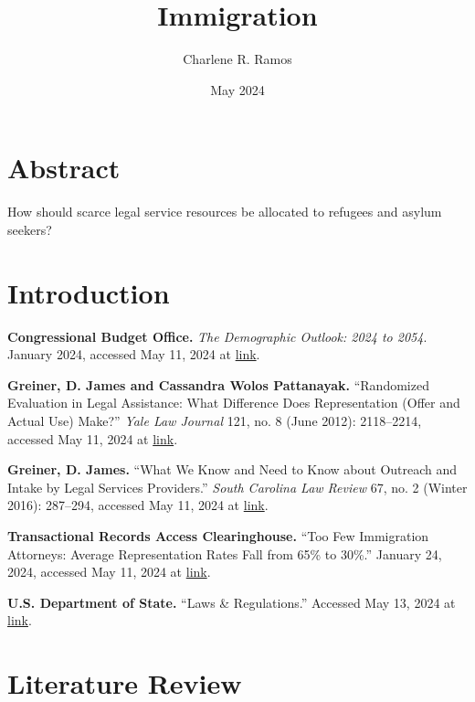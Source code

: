 \documentclass{article}
\title{Immigration}
\author{Charlene R. Ramos}
\date{May 2024}
\begin{document}
\maketitle

\section{Abstract} 
How should scarce legal service resources be allocated to refugees and asylum seekers? 

\section{Introduction}

\begin{hangparas}{.25in}{1}

\textbf{Congressional Budget Office.} \textit{The Demographic Outlook: 2024 to 2054}. January 2024, accessed May 11, 2024 at \href{https://tinyurl.com/37zcmst9}{link}.

\textbf{Greiner, D. James and Cassandra Wolos Pattanayak. }“Randomized Evaluation in Legal Assistance: What Difference Does Representation (Offer and Actual Use) Make?” \textit{Yale Law Journal} 121, no. 8 (June 2012): 2118–2214, accessed May 11, 2024 at \href{https://tinyurl.com/m3e27cbm}{link}.

\textbf{Greiner, D. James.} “What We Know and Need to Know about Outreach and Intake by Legal Services Providers.” \textit{South Carolina Law Review} 67, no. 2 (Winter 2016): 287–294, accessed May 11, 2024 at \href{https://scholarcommons.sc.edu/sclr/vol67/iss2/8/}{link}.

\textbf{Transactional Records Access Clearinghouse.} “Too Few Immigration Attorneys: Average Representation Rates Fall from 65\% to 30\%.” January 24, 2024, accessed May 11, 2024 at \href{https://trac.syr.edu/reports/736/}{link}.

\textbf{U.S. Department of State.} “Laws \& Regulations.” Accessed May 13, 2024 at \href{https://travel.state.gov/content/travel/en/legal/visa-law0/laws-regulations.html}{link}.

\end{hangparas}

\section{Literature Review}
\end{document}
